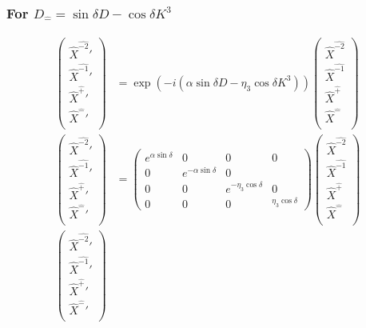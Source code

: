 \documentclass[]{article}
\numberwithin{equation}{section}
\begin{document}
{{\subsubsection{For $D_{\hat{-}}=\sin{\delta}D-\cos{\delta}K^{3}$}
\begin{align}
\begin{pmatrix}
    \hat{X}^{\hat{-2}}'\\
    \hat{X}^{\hat{-1}}'\\
    \hat{X}^{\hat{+}}'\\
    \hat{X}^{\hat{-}}'\\
    \end{pmatrix}&= \exp{\left(-i(\alpha \sin{\delta} D-\eta_{3} \cos{\delta}K^{3})\right)}\begin{pmatrix}
    \hat{X}^{\hat{-2}}\\
    \hat{X}^{\hat{-1}}\\
    \hat{X}^{\hat{+}}\\
    \hat{X}^{\hat{-}}\\
    \end{pmatrix}\\
    \begin{pmatrix}
    \hat{X}^{\hat{-2}}'\\
    \hat{X}^{\hat{-1}}'\\
    \hat{X}^{\hat{+}}'\\
    \hat{X}^{\hat{-}}'\\
    \end{pmatrix}&= \begin{pmatrix}
        e^{\alpha\sin{\delta}}&0&0&0\\
        0&e^{-\alpha\sin{\delta}}&0&\\
        0&0&e^{-\eta_{3}\cos{\delta}}&0\\
        0&0&0&^{\eta_{3}\cos{\delta}}
    \end{pmatrix}\begin{pmatrix}
    \hat{X}^{\hat{-2}}\\
    \hat{X}^{\hat{-1}}\\
    \hat{X}^{\hat{+}}\\
    \hat{X}^{\hat{-}}\\
    \end{pmatrix}\\
    \begin{pmatrix}
    \hat{X}^{\hat{-2}}'\\
    \hat{X}^{\hat{-1}}'\\
    \hat{X}^{\hat{+}}'\\
    \hat{X}^{\hat{-}}'\\

\end{pmatrix}
\end{align}}}
\end{document}
